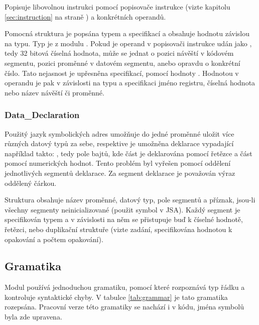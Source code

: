 \documentclass[czech, kiv, he, sem, pdf, viewonly]{fasthesis}
\begin{document}
Popisuje libovolnou instrukci pomocí popisovače instrukce (vizte kapitolu
\ref{sec:instruction} na straně \pageref{sec:instruction}) a konkrétních
operandů.

Pomocná struktura  je popsána typem a specifikací a obsahuje
hodnotu závislou na typu. Typ je  z modulu
. Pokud je operand v popisovači instrukce udán jako
, tedy 32 bitová číselná hodnota, může se jednat o pozici
návěští v kódovém segmentu, pozici proměnné v datovém segmentu, anebo opravdu o
konkrétní číslo. Tato nejasnost je upřesněna specifikací, pomocí hodnoty
. Hodnotou v operandu je pak v závislosti na
typu a specifikaci jméno registru, číselná hodnota nebo název návěští či
proměnné.

\subsubsection{Data\_Declaration}

Použitý jazyk symbolických adres umožňuje do jedné proměnné uložit více různých
datový typů za sebe, respektive je umožněna deklarace vypadající například
takto: , tedy pole bajtů, kde část je
deklarována pomocí řetězce a část pomocí numerických hodnot. Tento problém byl
vyřešen pomocí oddělení jednotlivých segmentů deklarace. Za segment deklarace je
považován výraz oddělený čárkou.

Struktura obsahuje název proměnné, datový typ, pole segmentů a příznak, jsou-li
všechny segmenty neinicializované (použit symbol  v JSA). Každý
segment je specifikován typem a v závislosti na něm se přistupuje buď k číselné
hodnotě, řetězci, nebo duplikační struktuře (vizte zadání, specifikována
hodnotou k opakování a počtem opakování).

\subsection{Gramatika}

Modul  používá jednoduchou gramatiku, pomocí které rozpoznává
typ řádku a kontroluje syntaktické chyby. V tabulce \ref{tab:grammar} je tato
gramatika rozepsána. Pracovní verze této gramatiky se nachází i v kódu, jména
symbolů byla zde upravena.


\end{document}
